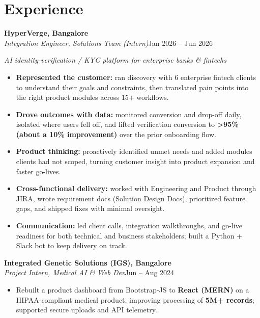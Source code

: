 \documentclass[10pt,a4paper]{article}
\begin{document}
\section*{Experience}
\vspace{1pt}\textbf{HyperVerge, Bangalore}\\
\textit{Integration Engineer, Solutions Team (Intern)}\hfill Jan 2026 -- Jun 2026\par\vspace{1pt}
{\small\itshape AI identity-verification / KYC platform for enterprise banks \& fintechs}\par\vspace{1pt}
\begin{itemize}
\item \textbf{Represented the customer:} ran discovery with 6 enterprise fintech clients to understand their goals and constraints, then translated pain points into the right product modules across 15+ workflows.
\item \textbf{Drove outcomes with data:} monitored conversion and drop-off daily, isolated where users fell off, and lifted verification conversion to \textbf{\textgreater{}95\% (about a 10\% improvement)} over the prior onboarding flow.
\item \textbf{Product thinking:} proactively identified unmet needs and added modules clients had not scoped, turning customer insight into product expansion and faster go-lives.
\item \textbf{Cross-functional delivery:} worked with Engineering and Product through JIRA, wrote requirement docs (Solution Design Docs), prioritized feature gaps, and shipped fixes with minimal oversight.
\item \textbf{Communication:} led client calls, integration walkthroughs, and go-live readiness for both technical and business stakeholders; built a Python + Slack bot to keep delivery on track.
\end{itemize}
\vspace{1pt}\textbf{Integrated Genetic Solutions (IGS), Bangalore}\\
\textit{Project Intern, Medical AI \& Web Dev}\hfill Jun -- Aug 2024\par\vspace{1pt}
\begin{itemize}
\item Rebuilt a product dashboard from Bootstrap-JS to \textbf{React (MERN)} on a HIPAA-compliant medical product, improving processing of \textbf{5M+ records}; supported secure uploads and API telemetry.
\end{itemize}
\end{document}
